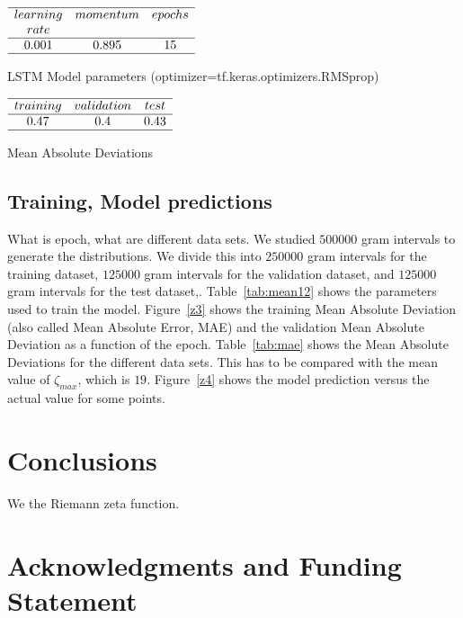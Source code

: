\documentclass[twoside]{article}
\begin{document}
\begin{table}
\centering \(\begin{array}{cccccccccccc}

\hline
learning     &momentum  &epochs  \\
rate    &  &  \\
\hline
0.001 &0.895  & 15  \\
\hline
\end{array}\)
\caption{LSTM Model parameters (optimizer=tf.keras.optimizers.RMSprop)}
\label{tab:mean12}
\end{table}

\begin{table}
\centering \(\begin{array}{cccccccccccc}

\hline
training     &validation  &test \\
\hline
0.47 &0.4  & 0.43  \\
\hline
\end{array}\)
\caption{Mean Absolute Deviations}
\label{tab:mae}
\end{table}

\subsection{\label{relation}Training,  Model predictions}

What is epoch, what are different data sets.
We studied $500000$ gram intervals  to generate the distributions.
We divide this into $250000$ gram intervals for the training dataset, 
$125000$ gram intervals for the validation dataset, 
and $125000$ gram intervals for the test dataset,.
Table~\ref{tab:mean12} shows the parameters used to train the model. 
Figure~\ref{z3} shows the training Mean Absolute Deviation (also called Mean Absolute Error, MAE) 
and the validation Mean Absolute Deviation as a function of the epoch.
Table~\ref{tab:mae} shows the Mean Absolute Deviations for the different data sets.  This has
to be compared with the mean value of $\zeta_{max}$, which is $19$.  Figure~\ref{z4}
shows the model prediction versus the actual value for some points.

\section{\label{conclusions}Conclusions}

We the Riemann zeta function.

\section*{Acknowledgments and Funding Statement}
\end{document}

